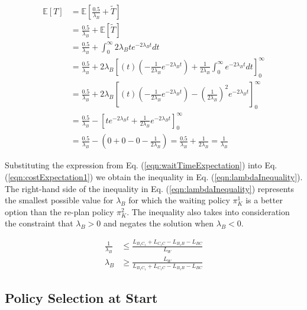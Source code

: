 \documentclass[a4paper,12pt]{article}
\begin{document}
			\begin{equation}
			\begin{split}
			\mathbb{E}\left[T\right] & = \mathbb{E}\left[\frac{0.5}{\lambda_{B}}+\widetilde{T}\right] \\
			& = \frac{0.5}{\lambda_{B}} + \mathbb{E}\left[\widetilde{T}\right] \\
			& = \frac{0.5}{\lambda_{B}} + \int_{0}^{\infty}2\lambda_{B}te^{-2\lambda_{B}t} dt \\
			& = \frac{0.5}{\lambda_{B}} + 2\lambda_{B}\left[\left(t\right) \left(-\frac{1}{2\lambda_{B}}e^{-2\lambda_{B}t}\right) + \frac{1}{2\lambda_{B}} \int_{0}^{\infty}e^{-2\lambda_{B}t} dt \right]_{0}^{\infty} \\
			& = \frac{0.5}{\lambda_{B}} + 2\lambda_{B}\left[\left(t\right) \left(-\frac{1}{2\lambda_{B}}e^{-2\lambda_{B}t}\right) - \left(\frac{1}{2\lambda_{B}}\right)^2 e^{-2\lambda_{B}t} \right]_{0}^{\infty} \\
			& = \frac{0.5}{\lambda_{B}} - \left[te^{-2\lambda_{B}t} + \frac{1}{2\lambda_{B}} e^{-2\lambda_{B}t} \right]_{0}^{\infty} \\
			& = \frac{0.5}{\lambda_{B}} - (0 + 0 - 0 - \frac{1}{2\lambda_{B}}) = \frac{0.5}{\lambda_{B}} + \frac{1}{2\lambda_{B}} = \frac{1}{\lambda_{B}}
			\end{split}
			\label{eqn:waitTimeExpectation}
			\end{equation}
			
			Substituting the expression from Eq. (\ref{eqn:waitTimeExpectation}) into Eq. (\ref{eqn:costExpectation1}) we obtain the inequality in Eq. (\ref{eqn:lambdaInequality}). The right-hand side of the inequality in Eq. (\ref{eqn:lambdaInequality}) represents the smallest possible value for $\lambda_{B}$ for which the waiting policy $\pi_K^1$ is a better option than the re-plan policy $\pi_K^2$. The inequality also takes into consideration the constraint that $\lambda_{B} > 0$ and negates the solution when $\lambda_{B} < 0$.
			
			\begin{equation}
			\begin{split}
			\frac{1}{\lambda_{B}} & \leq \frac{L_{B_{1}C_{1}} + L_{C_{1}C} - L_{B_{1}B} - L_{BC}}{L_W} \\	
			\lambda_{B} & \geq \frac{L_W}{L_{B_{1}C_{1}} + L_{C_{1}C} - L_{B_{1}B} - L_{BC}}
			\end{split}
			\label{eqn:lambdaInequality}
			\end{equation}
		
		\subsection{Policy Selection at Start}
		\label{sec:policySelectionAtStart}
		
\end{document}
